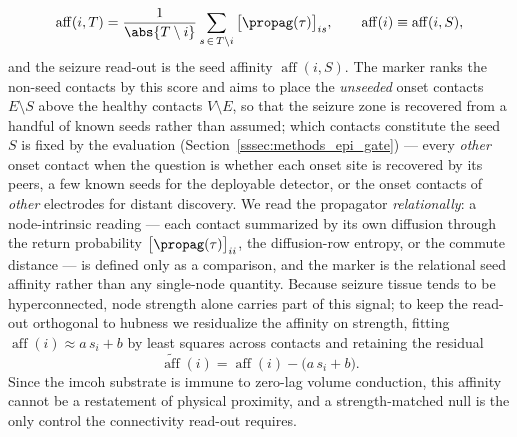 \begin{equation}
    \operatorname{aff}(i,T) = \frac{1}{\abs{T\setminus i}}\sum_{s\,\in\,T\setminus i}\big[\propag(\tau)\big]_{is}, \qquad \operatorname{aff}(i)\equiv\operatorname{aff}(i,S),
    \label{eq:methods_epi_aff}
\end{equation}
and the seizure read-out is the seed affinity \(\operatorname{aff}(i,S)\). The marker ranks the non-seed contacts by this score and aims to place the \emph{unseeded} onset contacts \(E\setminus S\) above the healthy contacts \(V\setminus E\), so that the seizure zone is recovered from a handful of known seeds rather than assumed; which contacts constitute the seed \(S\) is fixed by the evaluation (Section~\ref{sssec:methods_epi_gate}) --- every \emph{other} onset contact when the question is whether each onset site is recovered by its peers, a few known seeds for the deployable detector, or the onset contacts of \emph{other} electrodes for distant discovery. We read the propagator \emph{relationally}: a node-intrinsic reading --- each contact summarized by its own diffusion through the return probability \(\big[\propag(\tau)\big]_{ii}\), the diffusion-row entropy, or the commute distance --- is defined only as a comparison, and the marker is the relational seed affinity rather than any single-node quantity. Because seizure tissue tends to be hyperconnected, node strength alone carries part of this signal; to keep the read-out orthogonal to hubness we residualize the affinity on strength, fitting \(\operatorname{aff}(i)\approx a\,s_{i}+b\) by least squares across contacts and retaining the residual
\begin{equation}
    \widetilde{\operatorname{aff}}(i) = \operatorname{aff}(i) - \big(a\,s_{i}+b\big).
    \label{eq:methods_epi_resid}
\end{equation}
Since the \gls{imcoh} substrate is immune to zero-lag volume conduction, this affinity cannot be a restatement of physical proximity, and a strength-matched null is the only control the connectivity read-out requires.

